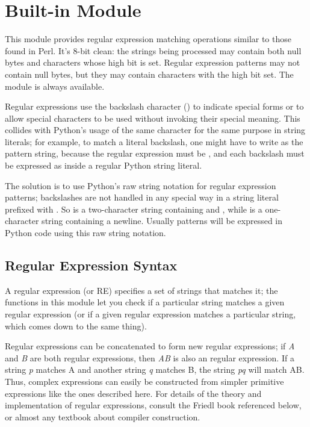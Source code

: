 \section{Built-in Module }
\label{module-re}


This module provides regular expression matching operations similar to
those found in Perl.  It's 8-bit clean: the strings being processed
may contain both null bytes and characters whose high bit is set.  Regular
expression patterns may not contain null bytes, but they may contain
characters with the high bit set.  The  module is always
available.

Regular expressions use the backslash character (\character{\e}) to
indicate special forms or to allow special characters to be used
without invoking their special meaning.  This collides with Python's
usage of the same character for the same purpose in string literals;
for example, to match a literal backslash, one might have to write
 as the pattern string, because the regular expression
must be \samp{\e\e}, and each backslash must be expressed as
\samp{\e\e} inside a regular Python string literal. 

The solution is to use Python's raw string notation for regular
expression patterns; backslashes are not handled in any special way in
a string literal prefixed with .  So  is a
two-character string containing \character{\e} and ,
while  is a one-character string containing a newline.
Usually patterns will be expressed in Python code using this raw
string notation.

\subsection{Regular Expression Syntax}
\label{re-syntax}

A regular expression (or RE) specifies a set of strings that matches
it; the functions in this module let you check if a particular string
matches a given regular expression (or if a given regular expression
matches a particular string, which comes down to the same thing).

Regular expressions can be concatenated to form new regular
expressions; if \emph{A} and \emph{B} are both regular expressions,
then \emph{AB} is also an regular expression.  If a string \emph{p}
matches A and another string \emph{q} matches B, the string \emph{pq}
will match AB.  Thus, complex expressions can easily be constructed
from simpler primitive expressions like the ones described here.  For
details of the theory and implementation of regular expressions,
consult the Friedl book referenced below, or almost any textbook about
compiler construction.

